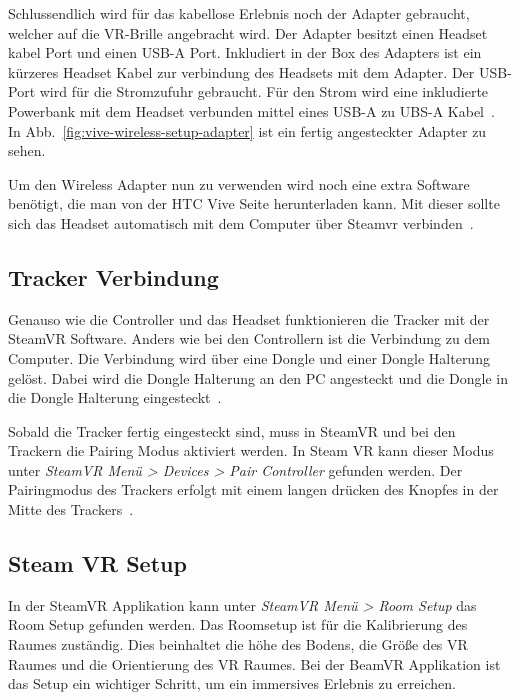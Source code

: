 Schlussendlich wird für das kabellose Erlebnis noch der Adapter gebraucht, welcher auf die VR-Brille angebracht wird.
Der Adapter besitzt einen Headset kabel Port und einen USB-A Port.
Inkludiert in der Box des Adapters ist ein kürzeres Headset Kabel zur verbindung des Headsets mit dem Adapter.
Der USB-Port wird für die Stromzufuhr gebraucht.
Für den Strom wird eine inkludierte Powerbank mit dem Headset verbunden mittel eines USB-A zu UBS-A Kabel~\cite{Wireless_Adapter_Setup_Page}.
In Abb.~\ref{fig:vive-wireless-setup-adapter} ist ein fertig angesteckter Adapter zu sehen.

Um den Wireless Adapter nun zu verwenden wird noch eine extra Software benötigt, die man von der HTC Vive Seite herunterladen kann.
Mit dieser sollte sich das Headset automatisch mit dem Computer über Steamvr verbinden~\cite{Wireless_Adapter_Setup_Page}.

\subsection{Tracker Verbindung}

Genauso wie die Controller und das Headset funktionieren die Tracker mit der SteamVR Software.
Anders wie bei den Controllern ist die Verbindung zu dem Computer.
Die Verbindung wird über eine Dongle und einer Dongle Halterung gelöst.
Dabei wird die Dongle Halterung an den PC angesteckt und die Dongle in die Dongle Halterung eingesteckt~\cite{vive_tracker_setup_video_2021}.

Sobald die Tracker fertig eingesteckt sind, muss in SteamVR und bei den Trackern die Pairing Modus aktiviert werden.
In Steam VR kann dieser Modus unter \emph{SteamVR Menü > Devices > Pair Controller} gefunden werden.
Der Pairingmodus des Trackers erfolgt mit einem langen drücken des Knopfes in der Mitte des Trackers~\cite{vive_tracker_setup_video_2021}.

\subsection{Steam VR Setup}\label{subsec:steam-vr-setup}

In der SteamVR Applikation kann unter \emph{SteamVR Menü > Room Setup} das Room Setup gefunden werden.
Das Roomsetup ist für die Kalibrierung des Raumes zuständig.
Dies beinhaltet die höhe des Bodens, die Größe des VR Raumes und die Orientierung des VR Raumes.
Bei der BeamVR Applikation ist das Setup ein wichtiger Schritt, um ein immersives Erlebnis zu erreichen.

